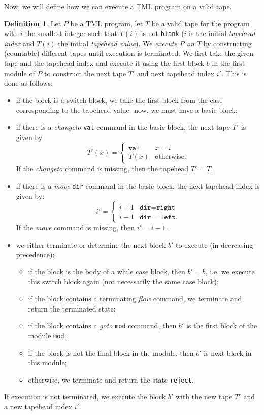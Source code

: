 \documentclass{amsart}
\theoremstyle{definition}
\newtheorem{definition}[rules]{Definition}
\begin{document}
    Now, we will define how we can execute a TML program on a valid tape.
    \begin{definition}
        Let $P$ be a TML program, let $T$ be a valid tape for the program with $i$ the smallest integer such that $T(i)$ is not \texttt{blank} ($i$ is the initial \emph{tapehead index} and $T(i)$ the initial \textit{tapehead value}). We \emph{execute $P$ on $T$} by constructing (countable) different tapes until execution is terminated. We first take the given tape and the tapehead index and execute it using the first block $b$ in the first module of $P$ to construct the next tape $T'$ and next tapehead index $i'$. This is done as follows:
        \begin{itemize}
            \item if the block is a switch block, we take the first block from the case corresponding to the tapehead value- now, we must have a basic block;
            \item if there is a \textit{changeto} \texttt{val} command in the basic block, the next tape $T'$ is given by 
            \[T'(x) = \begin{cases}
                \texttt{val} & x = i \\
                T(x) & \text{otherwise}.
            \end{cases}\]
            If the \textit{changeto} command is missing, then the tapehead $T' = T$.
            \item if there is a \textit{move} \texttt{dir} command in the basic block, the next tapehead index is given by:
            \[i' = \begin{cases}
                i+1 & \texttt{dir} = \texttt{right} \\
                i-1 & \texttt{dir} = \texttt{left}.
            \end{cases}\]
            If the \textit{move} command is missing, then $i' = i-1$.
            \item we either terminate or determine the next block $b'$ to execute (in decreasing precedence):
            \begin{itemize}
                \item if the block is the body of a while case block, then $b' = b$, i.e. we execute this switch block again (not necessarily the same case block); 
                \item if the block contains a terminating \textit{flow} command, we terminate and return the terminated state;
                \item if the block contains a \textit{goto} \texttt{mod} command, then $b'$ is the first block of the module \texttt{mod};
                \item if the block is not the final block in the module, then $b'$ is next block in this module;
                \item otherwise, we terminate and return the state \texttt{reject}.
            \end{itemize}
        \end{itemize}
        If execution is not terminated, we execute the block $b'$ with the new tape $T'$ and a new tapehead index $i'$.
    \end{definition}
\end{document}
